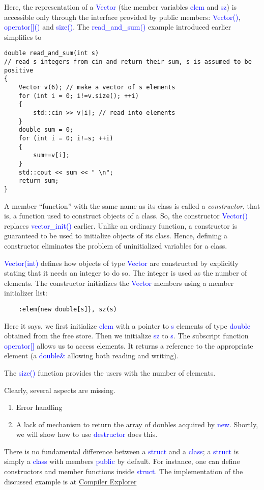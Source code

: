 \documentclass{article}
\newcommand{\be}[1]{\textcolor{blue}{#1}}
\begin{document}
Here, the representation of a \be{Vector} (the member variables \be{elem} and \be{sz}) is accessible only through the interface provided by public members: \be{Vector()}, \be{operator[]()} and \be{size()}. The \be{read\_and\_sum()} example introduced earlier simplifies to 
\begin{verbatim}
double read_and_sum(int s)
// read s integers from cin and return their sum, s is assumed to be positive
{
    Vector v(6); // make a vector of s elements
    for (int i = 0; i!=v.size(); ++i)
    {
        std::cin >> v[i]; // read into elements
    }
    double sum = 0;
    for (int i = 0; i!=s; ++i)
    {
        sum+=v[i];
    }
    std::cout << sum << " \n";
    return sum;
}	
\end{verbatim}
A member ``function'' with the same name as its class is called a \emph{constructor}, that is, a function used to construct objects of a class. So, the constructor \be{Vector()} replaces \be{vector\_init()} earlier. Unlike an ordinary function, a constructor is guaranteed to be used to initialize objects of its class. Hence, defining a constructor eliminates the problem of uninitialized variables for a class.

\be{Vector(int)} defines how objects of type \be{Vector} are constructed by explicitly stating that it needs an integer to do so. The integer is used as the number of elements. The constructor initializes the \be{Vector} members using a member initializer list:
\begin{verbatim}
	:elem{new double[s]}, sz(s)
\end{verbatim}
Here it says, we first initialize \be{elem} with a pointer to \be{s} elements of type \be{double} obtained from the free store. Then we initialize \be{sz} to \be{s}. The subscript function \be{operator[]} allows us to access elements. It returns a reference to the appropriate element (a \be{double\&} allowing both reading and writing).

The \be{size()} function provides the users with the number of elements.

Clearly, several aspects are missing.
\begin{enumerate}
	\item Error handling
	\item A lack of mechanism to return the array of doubles acquired by \be{new}. Shortly, we will show how to use \be{destructor} does this.
\end{enumerate}
There is no fundamental difference between a \be{struct} and a \be{class}; a \be{struct} is simply a \be{class} with members \be{public} by default. For instance, one can define constructors and member functions inside \be{struct}.
 The implementation of the discussed example is at 
\href{https://godbolt.org/z/E6M64s}{Compiler Explorer}
\end{document}
